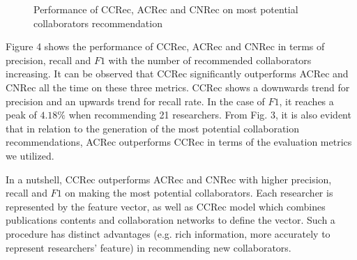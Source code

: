 \documentclass[review]{elsarticle}
\begin{document}
\begin{figure}
\centering
{}
\caption{Performance of CCRec, ACRec and CNRec on most potential collaborators recommendation}
\label{fig:3}       %
\end{figure}

Figure 4 shows the performance of CCRec, ACRec and CNRec in terms of precision, recall and $F1$ with the number of recommended collaborators increasing. It can be observed that CCRec significantly outperforms ACRec and CNRec all the time on these three metrics. CCRec shows a downwards trend for precision and an upwards trend for recall rate. In the case of $F1$, it reaches a peak of $4.18\%$ when recommending 21 researchers. From Fig. 3, it is also evident that in relation to the generation of the most potential collaboration recommendations, ACRec outperforms CCRec in terms of the evaluation metrics we utilized.

In a nutshell, CCRec outperforms ACRec and CNRec with higher precision, recall and $F1$ on making the most potential collaborators. Each researcher is represented by the feature vector, as well as CCRec model which combines publications contents and collaboration networks to define the vector. Such a procedure has distinct advantages (e.g. rich information, more accurately to represent researchers' feature) in recommending new collaborators.
\end{document}

